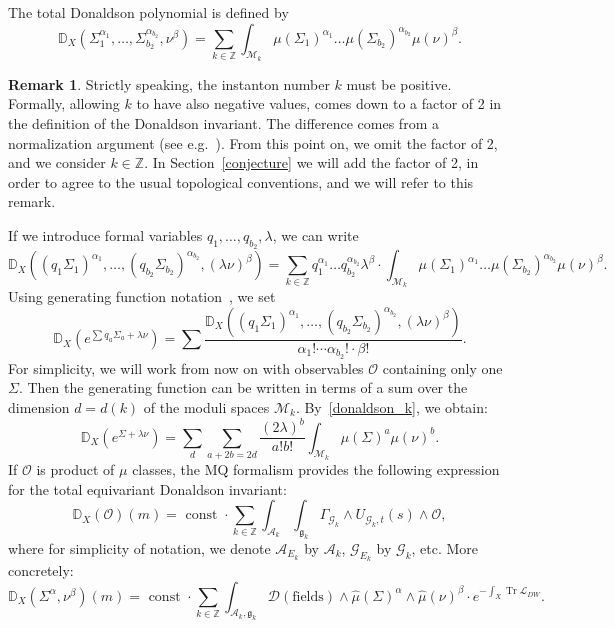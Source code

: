 \documentclass[a4paper,12pt,reqno,sumlimits]{amsart}
\theoremstyle{plain}
\theoremstyle{definition}
\newtheorem{rem}[thm]{Remark}
\newcommand{\D}{{\mathbb D}}
\newcommand{\Z}{{\mathbb Z}}
\newcommand{\1}{{\bf 1}}
\newcommand{\g}{{\mathfrak  g}}
\newcommand{\ex}[1]{{e^{#1}}}
\newcommand{\calA}{{\mathcal A}}
\newcommand{\calD}{{\mathcal D}}
\newcommand{\calG}{{\mathcal G}}
\newcommand{\calM}{{\mathcal M}}
\newcommand{\calO}{{\mathcal O}}
\newcommand{\calL}{{\mathcal L}}
\newcommand{\Tr}{\operatorname{Tr}}
\numberwithin{equation}{section}
\begin{document}
The total Donaldson polynomial is defined by
$$
\D_X(\Sigma_1^{\alpha_1},\dots,\Sigma_{b_2}^{\alpha_{b_2}},\nu^\beta)
=\sum_{k\in\Z}\int_{\calM_k}\mu(\Sigma_1)^{\alpha_1}\dots
\mu(\Sigma_{b_2})^{\alpha_{b_2}}\mu(\nu)^\beta.
$$
\begin{rem}
  \label{thetwofactor}
  Strictly speaking, the instanton number $k$ must be positive.  Formally,
  allowing $k$ to have also negative values, comes down to a factor of 2 in
  the definition of the Donaldson invariant.  The difference comes from a
  normalization argument (see e.g.~\cite[(2.18)]{ewdon2}). From this point
  on, we omit the factor of 2, and we consider $k\in\Z$. In
  Section~\ref{conjecture} we will add the factor of 2, in order to agree to
  the usual topological conventions, and we will refer to this remark.
\end{rem}
\noindent If we introduce formal variables $q_1,\dots,q_{b_2},\lambda$, we can write
$$
\D_X((q_1\Sigma_1)^{\alpha_1},\dots,(q_{b_2}\Sigma_{b_2})^{\alpha_{b_2}},
(\lambda\nu)^\beta)=\sum_{k\in\Z}q_1^{\alpha_1}\dots q_{b_2}^{\alpha_{b_2}}
\lambda^\beta\cdot\int_{\calM_k}\mu(\Sigma_1)^{\alpha_1}\dots
\mu(\Sigma_{b_2})^{\alpha_{b_2}}\mu(\nu)^\beta.
$$
Using generating function notation~\cite{ewdon}, we set
$$
\D_X\left(e^{\sum q_a\Sigma_a+\lambda\nu}\right)=
\sum \frac{\D_X((q_1\Sigma_1)^{\alpha_1},\dots,(q_{b_2}
  \Sigma_{b_2})^{\alpha_{b_2}},(\lambda\nu)^\beta)}{\alpha_1!\cdots
  \alpha_{b_2}!\cdot\beta!}.
$$
For simplicity, we will work from now on with observables $\calO$
containing only one $\Sigma$. Then the generating function can be written in
terms of a sum over the dimension $d=d(k)$ of the moduli spaces $\calM_k$.
By~\eqref{donaldson_k}, we obtain:
\begin{equation}
  \label{dwgeneratingfunction}
  \D_X\left(e^{\Sigma+\lambda\nu}\right)=
  \sum_{d}\sum_{a+2b=2d}\frac{(2\lambda)^b}{a!b!}
  \int_{\calM_k}\mu(\Sigma)^{a}\mu(\nu)^b.
\end{equation}
If $\calO$ is product of $\mu$ classes, the MQ formalism provides the
following expression for the total equivariant Donaldson invariant:
$$
\D_X(\calO)(m)=\text{ const }\cdot\sum_{k\in\Z}\int_{\calA_k}\int_{\g_k}
\Gamma_{\calG_k}\wedge U_{\calG_k,t}(s)\wedge\calO,
$$
where for simplicity of notation, we denote $\calA_{E_k}$ by $\calA_k$,
$\calG_{E_k}$ by $\calG_k$, etc.  More concretely:
$$
\D_X(\Sigma^{\alpha},\nu^\beta)(m) =\text{ const }
\cdot\sum_{k\in\Z}\int_{\calA_k,\g_k}
\calD(\text{fields})\wedge\hat{\mu}(\Sigma)^{\alpha}\wedge\hat{\mu}(\nu)^\beta
\cdot\ex{-\int_X\Tr{\calL_{DW}}}.
$$
\end{document}
